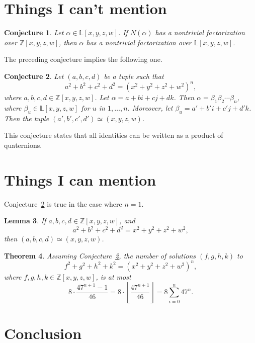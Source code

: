 \documentclass[12pt]{article}
\newtheorem{theorem}{Theorem}[section]
\newtheorem{lemma}[theorem]{Lemma}
\newtheorem{conjecture}[theorem]{Conjecture}
\theoremstyle{definition}
\newcommand{\Zzz}{\mathbb Z}
\newcommand{\Lll}{\mathbb L}
\numberwithin{equation}{section}
\begin{document}
\section{Things I can't mention}

\begin{conjecture}
Let \( \alpha \in \Lll[x,y,z,w] \).
If \( N(\alpha) \) has a nontrivial
factorization over \( \Zzz[x,y,z,w] \),
then \( \alpha \) has a nontrivial
factorization over \( \Lll[x,y,z,w] \).
\end{conjecture}
The preceding conjecture implies the following one.
\begin{conjecture}
\label{Ehrenborg-Leep}
Let \( (a, b, c, d) \) be a tuple such that
\[
a^2 + b^2 + c^2 + d^2 = (x^2 + y^2 + z^2 + w^2)^n,
\] 
where \( a, b, c, d \in \Zzz[x,y,z,w]\).
Let \(\alpha = a + bi + cj + dk \).
Then \( \alpha = \beta_1 \beta_2 \cdots \beta_n \),
where \( \beta_u \in \Lll[x,y,z,w] \) for \(u\) in \(1, \ldots, n\).
Moreover, let \( \beta_u = a' + b'i + c'j + d'k \). Then
the tuple \( (a', b', c', d') \simeq (x, y, z, w) \).
\end{conjecture}
This conjecture states that all identities can be written as
a product of quaternions. 


\section{Things I can mention}
Conjecture~\ref{Ehrenborg-Leep} is true in
the case where \(n = 1\).

\begin{lemma}
If \(a, b, c, d \in \Zzz[x,y,z,w]\), and
\[
a^2 + b^2 + c^2 + d^2 = x^2 + y^2 + z^2 + w^2,
\]
then \( (a, b, c, d ) \simeq (x, y, z, w )\).
\end{lemma}

\begin{theorem}
Assuming Conjecture~\ref{Ehrenborg-Leep},
the number of solutions \( (f, g, h, k) \) to
\[
f^2 + g^2 + h^2 + k^2 = (x^2 + y^2 + z^2 + w^2)^n,
\] 
where \( f, g, h, k \in \Zzz[x,y,z,w]\),
is at most
\[
8 \cdot \frac{47^{n+1} - 1}{46}
=  8 \cdot \left\lfloor \frac{ 47^{n+1} }{46} \right\rfloor
=  8 \sum_{i = 0}^n{47^n}.
\]
\end{theorem}





\section{Conclusion}
\end{document}
